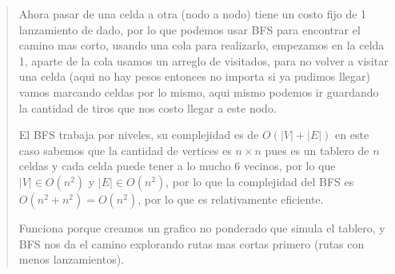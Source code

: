 \begin{quote}
    Ahora pasar de una celda a otra (nodo a nodo) tiene un costo fijo de 1 lanzamiento de dado, por lo que podemos usar BFS para encontrar el camino mas corto, usando una cola para realizarlo, empezamos en la celda 1, aparte de la cola usamos un arreglo de visitados, para no volver a visitar una celda (aqui no hay pesos entonces no importa si ya pudimos llegar) vamos marcando celdas por lo mismo, aqui mismo podemos ir guardando la cantidad de tiros que nos costo llegar a este nodo. \vspace{.2cm}

    El BFS trabaja por niveles, su complejidad es de $O(|V|+|E|)$ en este caso sabemos que la cantidad de vertices es $n \times n$ pues es un tablero de $n$ celdas y cada celda puede tener a lo mucho 6 vecinos, por lo que $|V| \in O(n^2)$ y $|E| \in O(n^2)$, por lo que la complejidad del BFS es $O(n^2+n^2)=O(n^2)$, por lo que es relativamente eficiente. \vspace{.2cm}

    Funciona porque creamos un grafico no ponderado que simula el tablero, y BFS nos da el camino explorando rutas mas cortas primero (rutas con menos lanzamientos). \vspace{.2cm}
\end{quote}